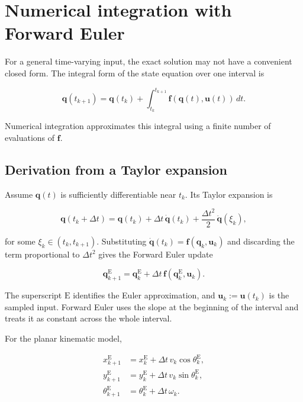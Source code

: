 \documentclass[
  australian,
  12pt,
  letterpaper,
  DIV=11,
  numbers=noendperiod,
  twoside]{scrreprt}
\begin{document}
\section{Numerical integration with Forward
Euler}\label{numerical-integration-with-forward-euler}

For a general time-varying input, the exact solution may not have a
convenient closed form. The integral form of the state equation over one
interval is

\[
\mathbf q(t_{k+1})
=
\mathbf q(t_k)
+
\int_{t_k}^{t_{k+1}}
\mathbf f(\mathbf q(t),\mathbf u(t))\,dt.
\]

Numerical integration approximates this integral using a finite number
of evaluations of \(\mathbf f\).

\subsection{Derivation from a Taylor
expansion}\label{derivation-from-a-taylor-expansion}

Assume \(\mathbf q(t)\) is sufficiently differentiable near \(t_k\). Its
Taylor expansion is

\[
\mathbf q(t_k+\Delta t)
=
\mathbf q(t_k)
+\Delta t\,\dot{\mathbf q}(t_k)
+\frac{\Delta t^2}{2}\,\ddot{\mathbf q}(\xi_k),
\]

for some \(\xi_k\in(t_k,t_{k+1})\). Substituting
\(\dot{\mathbf q}(t_k)=\mathbf f(\mathbf q_k,\mathbf u_k)\) and
discarding the term proportional to \(\Delta t^2\) gives the Forward
Euler update

\[
\boxed{
\mathbf q_{k+1}^{\mathrm E}
=
\mathbf q_k^{\mathrm E}
+\Delta t\,\mathbf f(\mathbf q_k^{\mathrm E},\mathbf u_k)
}.
\]

The superscript \(\mathrm E\) identifies the Euler approximation, and
\(\mathbf u_k\mathrel{:=}\mathbf u(t_k)\) is the sampled input. Forward
Euler uses the slope at the beginning of the interval and treats it as
constant across the whole interval.

For the planar kinematic model,

\[
\boxed{
\begin{aligned}
x_{k+1}^{\mathrm E}&=x_k^{\mathrm E}+\Delta t\,v_k\cos\theta_k^{\mathrm E},\\
y_{k+1}^{\mathrm E}&=y_k^{\mathrm E}+\Delta t\,v_k\sin\theta_k^{\mathrm E},\\
\theta_{k+1}^{\mathrm E}&=\theta_k^{\mathrm E}+\Delta t\,\omega_k.
\end{aligned}
}
\]
\end{document}

